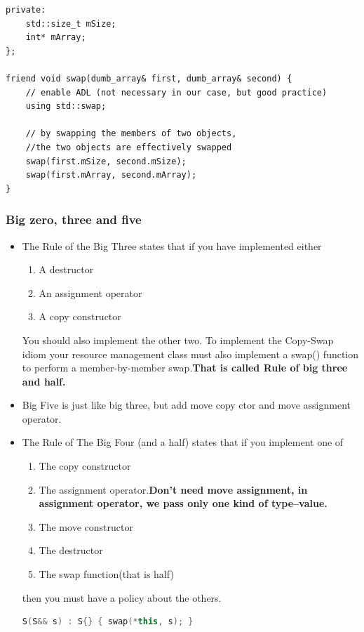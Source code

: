 \documentclass[a4paper,11pt,twoside]{book}
\begin{document}
\begin{itemize}
\begin{lstlisting}
private:
	std::size_t mSize;
	int* mArray;
};

friend void swap(dumb_array& first, dumb_array& second) {
	// enable ADL (not necessary in our case, but good practice)
	using std::swap;
	
	// by swapping the members of two objects, 
	//the two objects are effectively swapped
	swap(first.mSize, second.mSize);
	swap(first.mArray, second.mArray);
}

\end{lstlisting}
\end{itemize}
	
\subsubsection{Big zero, three and five}
\begin{itemize}
	\item The Rule of the Big Three states that if you have implemented either
	\begin{enumerate}
		\item A destructor
		\item An assignment operator
		\item A copy constructor
	\end{enumerate}
	You should also implement the other two. To implement the Copy-Swap idiom your resource management class must also implement a swap() function to perform a member-by-member swap.\textbf{That is called Rule of big three and half.}
	
	\item Big Five is just like big three, but add move copy ctor and move assignment operator.
	
	\item The Rule of The Big Four (and a half) states that if you implement one of
	\begin{enumerate}
		\item The copy constructor
		\item The assignment operator.\textbf{Don't need move assignment, in assignment operator, we pass only one kind of type--value.} 
		\item The move constructor
		\item The destructor
		\item The swap function(that is half)
	\end{enumerate}
	then you must have a policy about the others.
\begin{lstlisting}[frame=single, language=c++]
S(S&& s) : S{} { swap(*this, s); }


\end{lstlisting}
\end{itemize}
\end{document}
